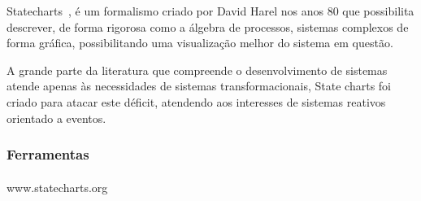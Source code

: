 Statecharts~\cite{Harel:1987:SVF:34884.34886}, é um formalismo criado por
David Harel nos anos 80 que possibilita descrever, de forma rigorosa como a
álgebra de processos, sistemas complexos de forma gráfica, possibilitando uma
visualização melhor do sistema em questão.

A grande parte da literatura que compreende o desenvolvimento de sistemas atende
apenas às necessidades de sistemas transformacionais, State charts foi criado para
atacar este déficit, atendendo aos interesses de sistemas reativos orientado a eventos.

\subsubsection{Ferramentas}
\paragraph{}
www.statecharts.org

